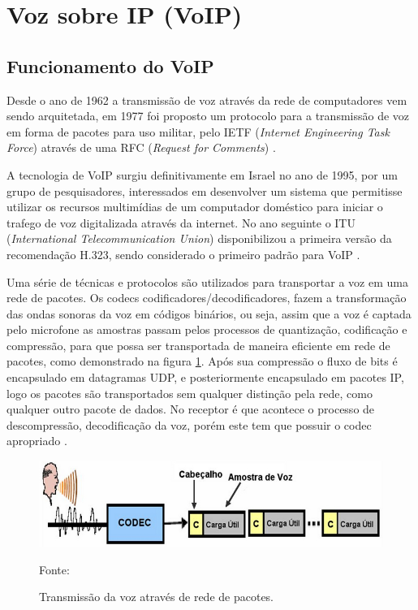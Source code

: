 \section{Voz sobre IP (VoIP)} %
\subsection{Funcionamento do VoIP}
Desde o ano de 1962 a transmissão de voz através da rede de computadores vem sendo arquitetada, em 1977 foi proposto um protocolo para a transmissão de voz em forma de pacotes para uso militar, pelo IETF (\textit{Internet Engineering Task Force}) através de uma RFC (\textit{Request for Comments}) \cite{dancohen1977}.

A tecnologia de VoIP surgiu definitivamente em Israel no ano de 1995, por um grupo de pesquisadores, interessados em desenvolver um sistema que permitisse utilizar os recursos multimídias de um computador doméstico para iniciar o trafego de voz digitalizada através da internet. No ano seguinte o ITU (\textit{International Telecommunication Union}) disponibilizou a primeira versão da recomendação H.323, sendo considerado o primeiro padrão para VoIP \cite{eduardomaronasmonks2006}.

Uma série de técnicas e protocolos são utilizados para transportar a voz em uma rede de pacotes. Os codecs  codificadores/decodificadores, fazem a transformação das ondas sonoras da voz em  códigos binários, ou seja, assim que a voz é captada pelo microfone as amostras passam pelos processos de quantização, codificação e compressão, para que possa ser transportada de maneira eficiente em rede de pacotes, como demonstrado na figura \ref{Figura6}. Após sua compressão o fluxo de bits é encapsulado em datagramas UDP, e posteriormente encapsulado em pacotes IP, logo os pacotes são transportados sem qualquer distinção pela rede, como qualquer outro pacote de dados. No receptor é que acontece o processo de descompressão, decodificação da voz, porém este tem que possuir o codec apropriado \cite{eduardomaronasmonks2006}.

\begin{figure}[h]
	\centering
	\includegraphics[width=15.0cm]{imagens/transmissaoVozRde.jpg}
	\caption{Transmissão da voz através de rede de pacotes.}
    \label{Figura6}
    Fonte: \cite{eduardomaronasmonks2006}
\end{figure}

